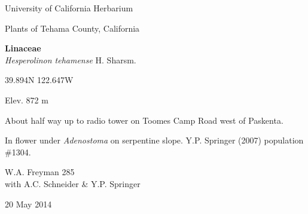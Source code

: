 \documentclass[letterpaper,10pt]{article}
\begin{document}
\begin{minipage}[t]{0.40\textwidth}

\begin{center}
University of California Herbarium \\
\begin{large}
Plants of Tehama County, California \\
\end{large}
\vspace{\baselineskip}
\textbf{Linaceae} \\
\textit{Hesperolinon tehamense} H. Sharsm.\\
\end{center}

\begin{footnotesize}

\begin{multicols}{2}
39.894\textdegree N 122.647\textdegree W
\columnbreak
\begin{flushright}
Elev. 872 m
\end{flushright}
\end{multicols}

About half way up to radio tower on Toomes Camp Road west of Paskenta.
\vspace{\baselineskip}

In flower under \textit{Adenostoma} on serpentine slope. Y.P. Springer (2007) population \#1304.

\begin{multicols}{2}
W.A. Freyman 285 \\
with A.C. Schneider \& Y.P. Springer
\columnbreak
\begin{flushright}
20 May 2014
\end{flushright}
\end{multicols}

\end{footnotesize}

\end{minipage}

\vspace{2cm}
%
%

%
%
\end{document}
